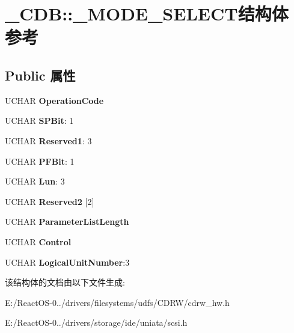 \hypertarget{struct___c_d_b_1_1___m_o_d_e___s_e_l_e_c_t}{}\section{\+\_\+\+C\+DB\+:\+:\+\_\+\+M\+O\+D\+E\+\_\+\+S\+E\+L\+E\+C\+T结构体 参考}
\label{struct___c_d_b_1_1___m_o_d_e___s_e_l_e_c_t}
\subsection*{Public 属性}
\begin{DoxyCompactItemize}
\item 
\mbox{\label{struct___c_d_b_1_1___m_o_d_e___s_e_l_e_c_t_a05dc36c5c13d450089ed06afe95c7bde}} 
U\+C\+H\+AR {\bfseries Operation\+Code}
\item 
\mbox{\label{struct___c_d_b_1_1___m_o_d_e___s_e_l_e_c_t_ae32a8a49711b6d0dd9fce40a899c6c40}} 
U\+C\+H\+AR {\bfseries S\+P\+Bit}\+: 1
\item 
\mbox{\label{struct___c_d_b_1_1___m_o_d_e___s_e_l_e_c_t_a16232c825b032f0dd3e8e213c3ad730b}} 
U\+C\+H\+AR {\bfseries Reserved1}\+: 3
\item 
\mbox{\label{struct___c_d_b_1_1___m_o_d_e___s_e_l_e_c_t_a61ac8d7bb8ece61e1272c26624a12db9}} 
U\+C\+H\+AR {\bfseries P\+F\+Bit}\+: 1
\item 
\mbox{\label{struct___c_d_b_1_1___m_o_d_e___s_e_l_e_c_t_a6b6bb5847187c79c52948d07776a9d2b}} 
U\+C\+H\+AR {\bfseries Lun}\+: 3
\item 
\mbox{\label{struct___c_d_b_1_1___m_o_d_e___s_e_l_e_c_t_a5ab48c0da8d93828b38d94c5e71336ba}} 
U\+C\+H\+AR {\bfseries Reserved2} \mbox{[}2\mbox{]}
\item 
\mbox{\label{struct___c_d_b_1_1___m_o_d_e___s_e_l_e_c_t_a9d174a72340ff345b2e7aeb05f7bfe2d}} 
U\+C\+H\+AR {\bfseries Parameter\+List\+Length}
\item 
\mbox{\label{struct___c_d_b_1_1___m_o_d_e___s_e_l_e_c_t_a9f867e0e392d68b3d30bfec503eefabe}} 
U\+C\+H\+AR {\bfseries Control}
\item 
\mbox{\label{struct___c_d_b_1_1___m_o_d_e___s_e_l_e_c_t_ab900680b334522e0da12af20052b2c54}} 
U\+C\+H\+AR {\bfseries Logical\+Unit\+Number}\+:3
\end{DoxyCompactItemize}


该结构体的文档由以下文件生成\+:\begin{DoxyCompactItemize}
\item 
E\+:/\+React\+O\+S-\/0../drivers/filesystems/udfs/\+C\+D\+R\+W/cdrw\+\_\+hw.\+h\item 
E\+:/\+React\+O\+S-\/0../drivers/storage/ide/uniata/scsi.\+h\end{DoxyCompactItemize}
